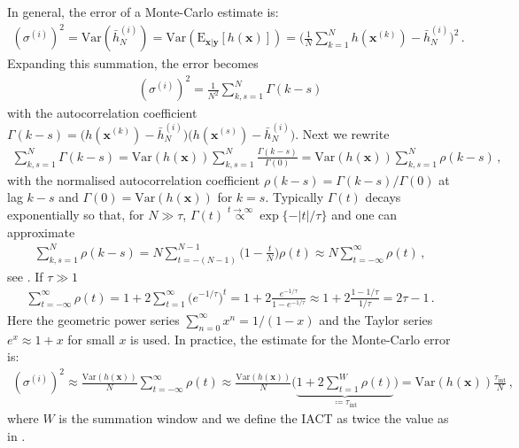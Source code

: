 In general, the error of a Monte-Carlo estimate is:
\begin{align}
	(\sigma^{(i)})^2 = \text{Var}(\bar{h}_N^{(i)}) =  \text{Var}(\text{E}_{\bm{x}|\bm{y}} [h(\bm{x})]) = \Bigg( \frac{1}{N} \sum_{k=1}^{N} h(\bm{x}^{(k)}) - \bar{h}_N^{(i)} \Bigg)^2 \, .
\end{align}
Expanding this summation, the error becomes
\begin{align}
	(\sigma^{(i)})^2 = \frac{1}{N^2} \sum_{k,s=1}^{N} \Gamma(k-s)
\end{align}
with the autocorrelation coefficient $\Gamma(k-s) =  \big( h(\bm{x}^{(k)}) -\bar{h}_N^{(i)} \big) \big(h(\bm{x}^{(s)}) - \bar{h}_N^{(i)}\big)$.
Next we rewrite
\begin{align}
	\sum_{k,s=1}^{N} \Gamma(k-s) = \text{Var}(h(\bm{x}))  \sum_{k,s=1}^{N} \frac{\Gamma(k-s)}{\Gamma(0)} =  \text{Var}(h(\bm{x})) \sum_{k,s=1}^{N}\rho(k-s)\, ,
\end{align}
with the normalised autocorrelation coefficient $\rho(k-s) =  \Gamma(k-s)/ \Gamma(0)$ at lag $k-s$ and $\Gamma(0) = \text{Var}(h(\bm{x}) )$ for $k=s$.
Typically $\Gamma(t)$ decays exponentially so that, for $N\gg \tau$, $\Gamma(t) \overset{t \rightarrow \infty }{ \propto} \exp\{ - |t| / \tau \}  $ and one can approximate
\begin{align}
	\sum_{k,s=1}^{N}\rho(k-s)  = N \sum_{t = -(N-1) }^{N-1} \Bigg(1- \frac{t}{N} \Bigg) \rho(t)  \approx N  \sum_{t = - \infty }^{\infty} \rho(t) \, ,
\end{align}
see \cite[p. 137]{Sokal1997}.
If $\tau \gg 1$
\begin{align}
	\sum_{t = - \infty }^{\infty} \rho(t) =  1 + 2 \sum_{t = 1}^{\infty} \big(e^{-1/ \tau}\big)^t =  1 + 2 \frac{e^{-1/ \tau} }{1 - e^{-1/ \tau}} \approx  1 + 2 \frac{1 -1/ \tau }{1/ \tau} =  2 \tau -1 \, .%
\end{align}
Here the geometric power series $\sum^{\infty}_{n=0} x^n= 1/ (1-x)$ and the Taylor series $ e^x \approx 1+x$ for small $x$ is used.
In practice, the estimate for the Monte-Carlo error is:
\begin{align}
	(\sigma^{(i)})^2   \approx \frac{\text{Var}(h(\bm{x}) )}{N} \sum_{t = - \infty }^{\infty} \rho(t)
	\approx \frac{\text{Var}(h(\bm{x}) )}{N} \Bigg( \underbrace{  1 + 2 \sum_{t = 1}^{W} \rho(t)  }_{ \coloneqq 	\tau_{\text{int}} }\Bigg) = \text{Var}(h(\bm{x})) \frac{ \tau_{\text{int}} }{N}\, ,
\end{align}
where $W$ is the summation window and we define the IACT as twice the value as in \cite[pp. 103-105]{wolff2002LecNot}.
